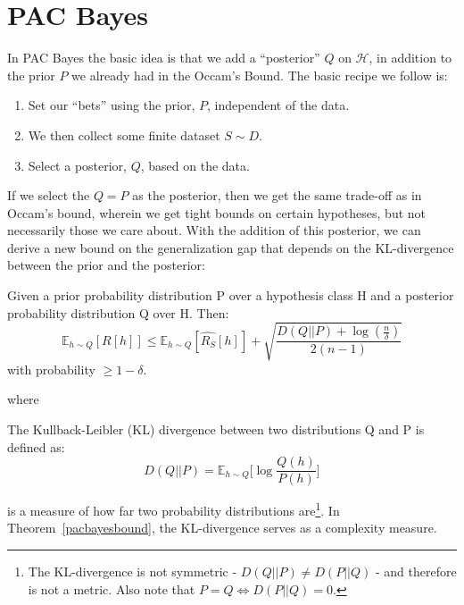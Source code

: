 \documentclass{article}
\begin{document}
\section{PAC Bayes}
In PAC Bayes the basic idea is that we add a ``posterior'' $Q$ on $\mathcal{H}$, in addition to the prior $P$ we already had in the Occam's Bound. The basic recipe we follow is:
\begin{enumerate}
    \item Set our ``bets'' using the prior, $P$, independent of the data.
    \item We then collect some finite dataset $S\sim D$.
    \item Select a posterior, $Q$, based on the data.
\end{enumerate}
If we select the $Q=P$ as the posterior, then we get the same trade-off as in Occam's bound, wherein we get tight bounds on certain hypotheses, but not necessarily those we care about.
With the addition of this posterior, we can derive a new bound on the generalization gap that depends on the KL-divergence between the prior and the posterior:

\begin{thm}
Given a prior probability distribution P over a hypothesis class H and a posterior probability distribution Q over H. Then: 
\[
	\mathbb{E}_{h \sim Q}[R[h]] \leq \mathbb{E}_{h \sim Q} [\hat{R_S}[h]] + \sqrt{\frac{D(Q||P) +
	\log(\frac{n}{\delta})}{2(n-1)}}
\] 
with probability $\geq 1 - \delta$.
\label{pacbayesbound}
\end{thm}
where 
\begin{defn} The Kullback-Leibler (KL) divergence between two distributions Q and P is defined as:
\[
	D(Q||P) = \mathbb{E}_{h \sim Q}\bigg[\log\frac{Q(h)}{P(h)}\bigg]
\]
\end{defn}
is a measure of how far two probability distributions are\footnote{The KL-divergence is not symmetric - $D(Q||P) \neq D(P||Q)$ - and therefore is not a metric. Also note that $ P = Q \iff D(P||Q) = 0 $.}. In Theorem~\ref{pacbayesbound}, the KL-divergence serves as a complexity measure.
\end{document}
